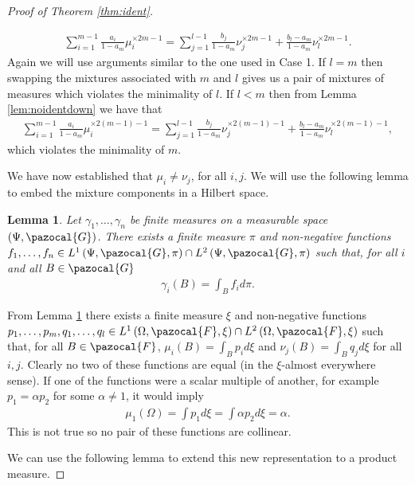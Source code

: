 \documentclass[aos,preprint]{imsart}
\def\sF{\pazocal{F}}
\def\sG{\pazocal{G}}
\theoremstyle{plain}
\newtheorem{lem}{Lemma}[section]
\theoremstyle{defintion}
\begin{document}
\begin{proof}[Proof of Theorem \ref{thm:ident}]
\begin{description}
				\begin{eqnarray*}
					\sum_{i=1}^{m-1} \frac{a_i}{1-a_m} \mu_i^{\times 2m-1} = \sum_{j=1}^{l-1} \frac{b_j}{1-a_m} \nu_{j}^{\times 2m-1} + \frac{b_l - a_m}{1-a_m} \nu_l^{\times 2m-1}.
				\end{eqnarray*}
				Again we will use arguments similar to the one used in Case 1. If $l=m$ then swapping the mixtures associated with $m$ and $l$ gives us a pair of mixtures of measures which violates the minimality of $l$. If $l<m$ then from Lemma \ref{lem:noidentdown} we have that
				\begin{eqnarray*}
					\sum_{i=1}^{m-1} \frac{a_i}{1-a_m} \mu_i^{\times 2(m-1)-1} = \sum_{j=1}^{l-1} \frac{b_j}{1-a_m} \nu_{j}^{\times 2(m-1)-1} + \frac{b_l - a_m}{1-a_m} \nu_l^{\times 2(m-1)-1},
				\end{eqnarray*}
				which violates the minimality of $m$.
		\end{description}

		We have now established that $\mu_i \neq \nu_j$, for all $i,j$.
		We will use the following lemma to embed the mixture components in a Hilbert space.
		\begin{lem} \label{lem:himbed}
			Let $\gamma_1,\ldots,\gamma_n$ be finite measures on a measurable space $\left( \Psi, \sG \right)$. There exists a finite measure $\pi$ and non-negative functions $f_1,\ldots,f_n \in  L^1\left( \Psi,\sG,\pi \right)\cap L^2\left( \Psi,\sG,\pi \right)$ such that, for all $i$ and all $B \in \sG$
			\begin{eqnarray*}
				\gamma_i(B)=\int_B f_i d\pi. 
			\end{eqnarray*}
		\end{lem}
		From Lemma \ref{lem:himbed} there exists a finite measure $\xi$ and non-negative functions $p_1,\ldots,p_m,q_1,\ldots,q_l \in L^1\left( \Omega, \sF, \xi \right)\cap L^2\left( \Omega, \sF, \xi \right)$ such that, for all $B\in \sF$, $\mu_i(B) = \int_B p_i d\xi$ and $\nu_j(B) = \int_B q_j d\xi$ for all $i,j$. Clearly no two of these functions are equal (in the $\xi$-almost everywhere sense). If one of the functions were a scalar multiple of another, for example $p_1 = \alpha p_2$ for some $\alpha \neq 1$, it would imply
		\begin{eqnarray*}
			\mu_1\left( \Omega \right) = \int p_1 d\xi = \int \alpha p_2 d\xi=\alpha.
		\end{eqnarray*}
		This is not true so no pair of these functions are collinear.

		We can use the following lemma to extend this new representation to a product measure.


\end{proof}
\end{document}
